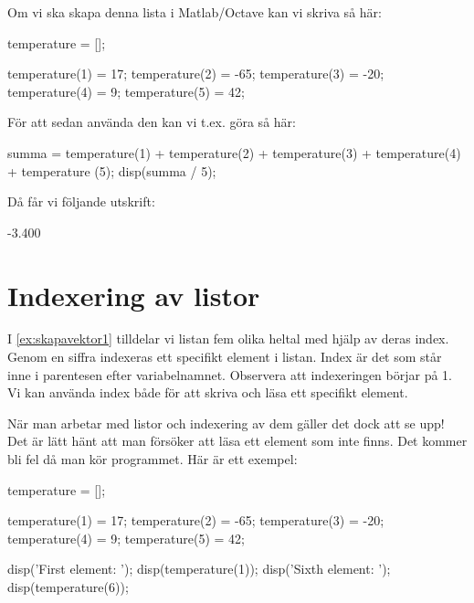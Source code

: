 Om vi ska skapa denna lista i Matlab/Octave kan vi skriva så här:

\begin{matlab}[caption={Skapa lista},label={ex:skapavektor1}]
temperature = [];

temperature(1) = 17;
temperature(2) = -65;
temperature(3) = -20;
temperature(4) = 9;
temperature(5) = 42;
\end{matlab}

För att sedan använda den kan vi t.ex. göra så här:

\begin{matlab}[caption={Använda lista},label={ex:lasavektor1}]
summa = temperature(1) + temperature(2) + temperature(3) + temperature(4) + temperature (5);
disp(summa / 5);
\end{matlab}

Då får vi följande utskrift:

\vspace{10pt}
\begin{matlab}
-3.400
\end{matlab}

\section{Indexering av listor}

I \autoref{ex:skapavektor1} tilldelar vi listan fem olika heltal med hjälp av deras index. Genom en siffra indexeras ett specifikt element i listan. Index är det som står inne i parentesen efter variabelnamnet. Observera att indexeringen börjar på 1. Vi kan använda index både för att skriva och läsa ett specifikt element.

När man arbetar med listor och indexering av dem gäller det dock att se upp! Det är lätt hänt att man försöker att läsa ett element som inte finns. Det kommer bli fel då man kör programmet. Här är ett exempel:

\begin{matlab}[caption={Felaktig indexering av en lista},label={}]
temperature = [];

temperature(1) = 17;
temperature(2) = -65;
temperature(3) = -20;
temperature(4) = 9;
temperature(5) = 42;

disp('First element: ');
disp(temperature(1));
disp('Sixth element: ');
disp(temperature(6)); %
\end{matlab}

